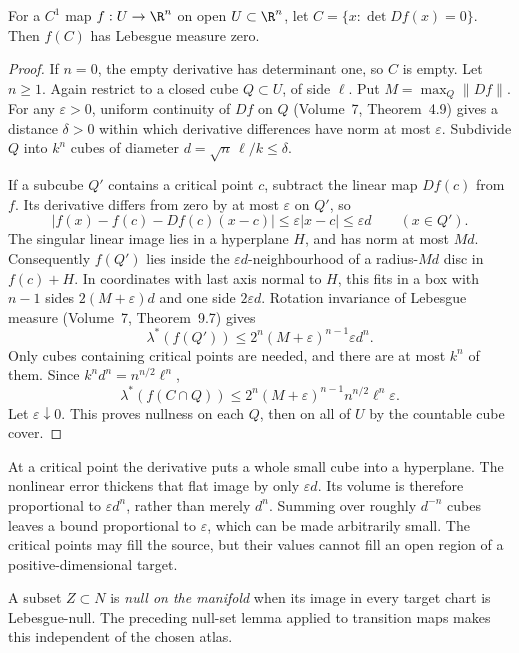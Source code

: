 \begin{theorem}\label{thm:sard}
For a $C^1$ map $f:U\to\R^n$ on open $U\subset\R^n$, let $C=\{x:\det Df(x)=0\}$. Then $f(C)$ has Lebesgue measure zero.
\end{theorem}
\begin{proof}
If $n=0$, the empty derivative has determinant one, so $C$ is empty. Let $n\ge1$. Again restrict to a closed cube $Q\subset U$, of side $\ell$. Put $M=\max_Q\|Df\|$. For any $\varepsilon>0$, uniform continuity of $Df$ on $Q$ (Volume~7, Theorem~4.9) gives a distance $\delta>0$ within which derivative differences have norm at most $\varepsilon$. Subdivide $Q$ into $k^n$ cubes of diameter $d=\sqrt n\,\ell/k\le\delta$.

If a subcube $Q'$ contains a critical point $c$, subtract the linear map $Df(c)$ from $f$. Its derivative differs from zero by at most $\varepsilon$ on $Q'$, so
\[
|f(x)-f(c)-Df(c)(x-c)|\le\varepsilon|x-c|\le\varepsilon d
\qquad(x\in Q').
\]
The singular linear image lies in a hyperplane $H$, and has norm at most $Md$. Consequently $f(Q')$ lies inside the $\varepsilon d$-neighbourhood of a radius-$Md$ disc in $f(c)+H$. In coordinates with last axis normal to $H$, this fits in a box with $n-1$ sides $2(M+\varepsilon)d$ and one side $2\varepsilon d$. Rotation invariance of Lebesgue measure (Volume~7, Theorem~9.7) gives
\[
\lambda^*(f(Q'))\le2^n(M+\varepsilon)^{n-1}\varepsilon d^n.
\]
Only cubes containing critical points are needed, and there are at most $k^n$ of them. Since $k^nd^n=n^{n/2}\ell^n$,
\[
\lambda^*(f(C\cap Q))\le
2^n(M+\varepsilon)^{n-1}n^{n/2}\ell^n\varepsilon.
\]
Let $\varepsilon\downarrow0$. This proves nullness on each $Q$, then on all of $U$ by the countable cube cover.
\end{proof}

\begin{beauty}
At a critical point the derivative puts a whole small cube into a hyperplane. The nonlinear error thickens that flat image by only $\varepsilon d$. Its volume is therefore proportional to $\varepsilon d^n$, rather than merely $d^n$. Summing over roughly $d^{-n}$ cubes leaves a bound proportional to $\varepsilon$, which can be made arbitrarily small. The critical points may fill the source, but their values cannot fill an open region of a positive-dimensional target.
\end{beauty}

A subset $Z\subset N$ is \emph{null on the manifold} when its image in every target chart is Lebesgue-null. The preceding null-set lemma applied to transition maps makes this independent of the chosen atlas.

